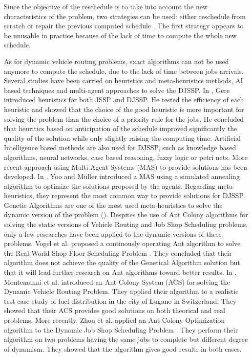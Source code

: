 \documentclass[a4paper,10pt]{article}
\begin{document}
Since the objective of the reschedule is to take into account the new characteristics of the problem, two strategies can be used: either reschedule from scratch or repair the previous computed schedule \cite{Ouelhadj2009}. The first strategy appears to be unusable in practice because of the lack of time to compute the whole new schedule.

As for dynamic vehicle routing problems, exact algorithms can not be used anymore to compute the schedule, due to the lack of time between jobs arrivals. Several studies have been carried on heuristics and meta-heuristics methods, AI based techniques and multi-agent approaches to solve the DJSSP.
In \cite{Gere1966}, Gere introduced heuristics for both JSSP and DJSSP. He tested the efficiency of each heuristic and showed that the choice of the good heuristic is more important for solving the problem than the choice of a priority rule for the jobs. He concluded that heuritics based on anticipation of the schedule improved significantly the quality of the solution while only slightly raising the computing time.
Artificial Intelligence based methods are also used for DJSSP, such as knowledge based algorithms, neural networks, case based reasoning, fuzzy logic or petri nets.
More recent approach using Multi-Agent Systems (MAS) to provide solutions has been developed. In \cite{Yoo2002}, Yoo and M\"{u}ller introduced a MAS using a simulated annealing algorithm to optimize the solutions proposed by the agents.
Regarding meta-heuristics, they represent the most common way to provide solutions for DJSSP. Genetic Algorithms are one of the most used meta-heuristics to solve the dynamic version of the problem (\cite{Lin1997, Qi2000}).
Despites the use of Ant Colony algorithms for solving the static versions of Vehicle Routing and Job Shop Scheduling problems, only a few researches have been applied to the dynamic versions of these problems. Vogel et al. proposed a continously operating Ant algorithm to solve the Real World Shop Floor Scheduling Problem \cite{Vogel2002}. They concluded that their algorithm does not achieve the quality of the Genetical Algorithm solution but that it will lead further research on Ant algorithms toward better results.
In \cite{Montemanni2005}, Montemanni et al. introduced an Ant Colony System (ACS) for solving the Dynamic Vehicle Routing Problem. They applied their algorithm to a realistic test case study of fuel distribution in the city of Lugano in Switzerland. They showed that their ACS provides good solutions on both theorical and real problems.
More recently, Zhou et al. applied an Ant Colony Optimization algorithm to the Dynamic Job Shop Scheduling Problem \cite{Zhou2008}. They perform their algorithm on two problems having the same jobs to complete but different degree of dynamism. They showed that the algorithm gives good results in both cases.\\
\end{document}
